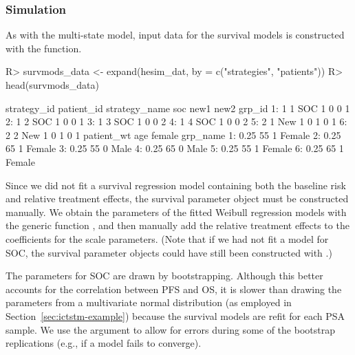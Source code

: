\documentclass[article, nojss]{jss}\usepackage[]{graphicx}\usepackage[]{color}
\begin{document}
\subsubsection{Simulation}
As with  the multi-state model, input data for the survival models is constructed with the  function.

\begin{Schunk}
\begin{Sinput}
R> survmods_data <- expand(hesim_dat, by = c("strategies", "patients"))
R> head(survmods_data)
\end{Sinput}
\begin{Soutput}
   strategy_id patient_id strategy_name soc new1 new2 grp_id
1:           1          1           SOC   1    0    0      1
2:           1          2           SOC   1    0    0      1
3:           1          3           SOC   1    0    0      2
4:           1          4           SOC   1    0    0      2
5:           2          1         New 1   0    1    0      1
6:           2          2         New 1   0    1    0      1
   patient_wt age female grp_name
1:       0.25  55      1   Female
2:       0.25  65      1   Female
3:       0.25  55      0     Male
4:       0.25  65      0     Male
5:       0.25  55      1   Female
6:       0.25  65      1   Female
\end{Soutput}
\end{Schunk}

Since we did not fit a survival regression model containing both the baseline risk and relative treatment effects, the survival parameter object must be constructed manually. We obtain the parameters of the fitted Weibull regression models with the generic function , and then manually add the relative treatment effects to the coefficients for the scale parameters. (Note that if we had not fit a model for SOC, the survival parameter objects could have still been constructed with .) 

The parameters for SOC are drawn by bootstrapping. Although this better accounts for the correlation between PFS and OS, it is slower than drawing the parameters from a multivariate normal distribution (as employed in Section~\ref{sec:ictstm-example}) because the survival models are refit for each PSA sample. We use the  argument to allow for errors during some of the bootstrap replications (e.g., if a model fails to converge).
\end{document}
